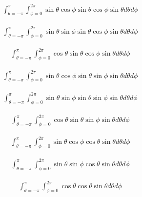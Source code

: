 \documentclass[]{article}
\begin{document}
\begin{align*}
\int_{\theta=-\pi}^{\pi}\int_{\phi=0}^{2\pi}\sin\theta\cos\phi\sin\theta\cos\phi\sin\theta d\theta d\phi
\end{align*}

\begin{align*}
\int_{\theta=-\pi}^{\pi}\int_{\phi=0}^{2\pi}\sin\theta\sin\phi\sin\theta\cos\phi\sin\theta d\theta d\phi
\end{align*}

\begin{align*}
\int_{\theta=-\pi}^{\pi}\int_{\phi=0}^{2\pi}\cos\theta\sin\theta\cos\phi\sin\theta d\theta d\phi
\end{align*}

\begin{align*}
\int_{\theta=-\pi}^{\pi}\int_{\phi=0}^{2\pi}\sin\theta\cos\phi\sin\theta\sin\phi \sin\theta d\theta d\phi
\end{align*}

\begin{align*}
\int_{\theta=-\pi}^{\pi}\int_{\phi=0}^{2\pi}\sin\theta\sin\phi\sin\theta\sin\phi \sin\theta d\theta d\phi
\end{align*}

\begin{align*}
\int_{\theta=-\pi}^{\pi}\int_{\phi=0}^{2\pi}\cos\theta\sin\theta\sin\phi \sin\theta d\theta d\phi
\end{align*}

\begin{align*}
\int_{\theta=-\pi}^{\pi}\int_{\phi=0}^{2\pi}\sin\theta\cos\phi\cos\theta\sin\theta d\theta d\phi
\end{align*}

\begin{align*}
\int_{\theta=-\pi}^{\pi}\int_{\phi=0}^{2\pi}\sin\theta\sin\phi\cos\theta\sin\theta d\theta d\phi
\end{align*}

\begin{align*}
\int_{\theta=-\pi}^{\pi}\int_{\phi=0}^{2\pi}\cos\theta\cos\theta\sin\theta d\theta d\phi
\end{align*}
\end{document}

